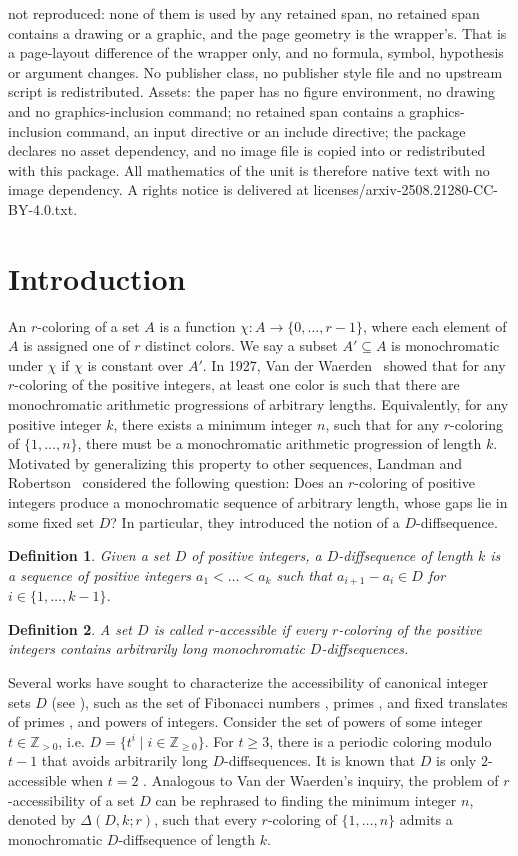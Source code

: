 \documentclass[10pt,a4paper]{amsart}
\newtheorem{definition}{Definition}
\begin{document}
not reproduced: none of them is used by any retained span, no retained span contains a drawing or a graphic, and the page geometry is the wrapper's. That is a page-layout difference of the wrapper only, and no formula, symbol, hypothesis or argument changes. No publisher class, no publisher style file and no upstream script is redistributed. Assets: the paper has no figure environment, no drawing and no graphics-inclusion command; no retained span contains a graphics-inclusion command, an input directive or an include directive; the package declares no asset dependency, and no image file is copied into or redistributed with this package. All mathematics of the unit is therefore native text with no image dependency. A rights notice is delivered at licenses/arxiv-2508.21280-CC-BY-4.0.txt.
\section{Introduction}
An $r$-coloring of a set $A$ is a function $\chi : A \to \{0, \ldots, r-1\}$, where each element of $A$ is assigned one of $r$ distinct colors. We say a subset $A' \subseteq A$ is monochromatic under $\chi$ if $\chi$ is constant over $A'$. In 1927, Van der Waerden~\cite{Waerdan} showed that for any $r$-coloring of the positive integers, at least one color is such that there are monochromatic arithmetic progressions of arbitrary lengths. Equivalently, for any positive integer $k$, there exists a minimum integer $n$, such that for any $r$-coloring of $\{1,\ldots, n \}$, there must be a monochromatic arithmetic progression of length $k$. Motivated by generalizing this property to other sequences, Landman and Robertson~\cite{LR} considered the following question: Does an $r$-coloring of positive integers produce a monochromatic sequence of arbitrary length, whose gaps lie in some fixed set $D$? In particular, they introduced the notion of a $D$-diffsequence.
\begin{definition}
    Given a set $D$ of positive integers, a $D$-\textit{diffsequence} of length $k$ is a sequence of positive integers $a_1 < \dots < a_k$ such that $a_{i+1}-a_i\in D$ for $i \in \{1,\dots,k-1\}$.
\end{definition}
\begin{definition}
    A set $D$ is called $r$-accessible if every $r$-coloring of the positive integers contains arbitrarily long monochromatic $D$-diffsequences.
\end{definition}
Several works have sought to characterize the accessibility of canonical integer sets $D$ (see \cite{book}), such as the set of Fibonacci numbers \cite{LR, Wesley}, primes \cite{LR}, and fixed translates of primes \cite{LV10}, and powers of integers. Consider the set of powers of some integer $t \in \mathbb{Z}_{> 0}$, i.e. $D = \{ t^{i}   \mid i \in \mathbb{Z}_{\ge 0}\}$. For $t\ge 3$, there is a periodic coloring modulo $t-1$ that avoids arbitrarily long $D$-diffsequences. It is known that $D$ is only $2$-accessible when $t = 2$ \cite{book}. Analogous to Van der Waerden's inquiry, the problem of $r$-accessibility of a set $D$ can be rephrased to finding the minimum integer $n$, denoted by $\Delta(D,k;r)$, such that every $r$-coloring of $\{1, \ldots, n\}$ admits a monochromatic $D$-diffsequence of length $k$. 
\end{document}
